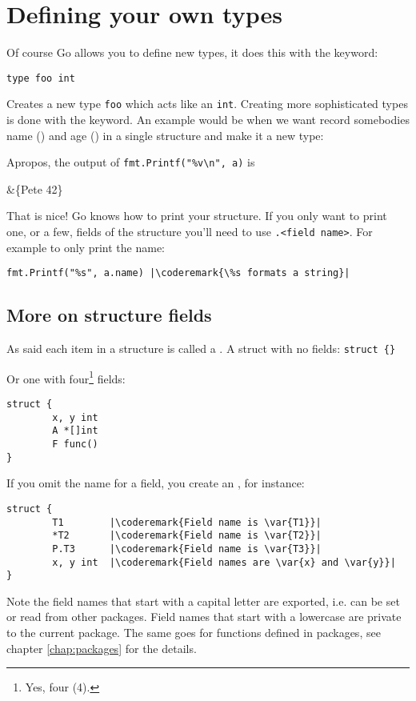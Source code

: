 \section{Defining your own types}
\label{sec:defining your own}
Of course Go allows you to define new types, it does this 
with the  keyword: 
\begin{lstlisting}
type foo int
\end{lstlisting}
Creates
a new type \lstinline{foo} which acts like an \lstinline{int}.
Creating more sophisticated types is done with the
keyword.
An example would be when we want record somebodies name ()
and age () in a single structure and make it a new type:

Apropos, the output of \lstinline{fmt.Printf("%v\n", a)} is 
\begin{display}
&\{Pete 42\}
\end{display}
That is nice!
Go knows how to print your structure. If you
only want to print one, or a few, fields of the structure you'll
need to use \verb|.<field name>|. For example to only print the name:
\begin{lstlisting}
fmt.Printf("%s", a.name) |\coderemark{\%s formats a string}|
\end{lstlisting}

\subsection{More on structure fields}
As said each item in a structure is called a .
A struct with no fields: \lstinline|struct {}|

Or one with four\footnote{Yes, four (4).} fields:
\begin{lstlisting}
struct {
        x, y int
        A *[]int
        F func()
}
\end{lstlisting}
If you omit the name for a field, you create an 
, for instance:
\begin{lstlisting}
struct {
        T1        |\coderemark{Field name is \var{T1}}|
        *T2       |\coderemark{Field name is \var{T2}}|
        P.T3      |\coderemark{Field name is \var{T3}}|
        x, y int  |\coderemark{Field names are \var{x} and \var{y}}|
}
\end{lstlisting}
Note the field names that start with a capital letter are exported, i.e. can be
set or read from other packages. Field names that start with a lowercase are private
to the current package. The same goes for functions defined in packages, see chapter
\ref{chap:packages} for the details.


